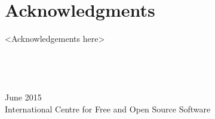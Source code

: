\cleardoublepage
{}
{}
\chapter*{Acknowledgments}
\vspace{1.0in}
<Acknowledgements here>
\\
\\
\\ 
\\
\\
June 2015\\
{International Centre for Free and Open Source Software}\\
\newpage
